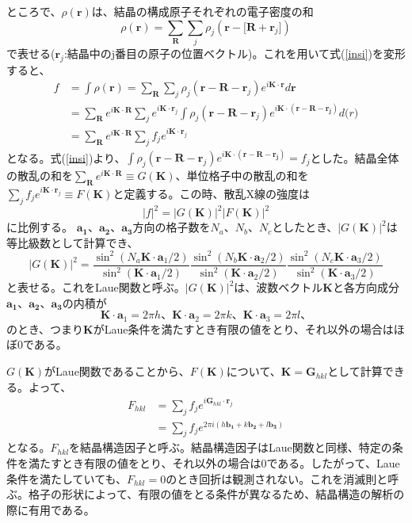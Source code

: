 \documentclass[11pt,a4j,uplatex]{jsarticle}
\begin{document}
\newpage
ところで、$\rho(\bm{r})$は、結晶の構成原子それぞれの電子密度の和
\begin{equation}
 \rho(\bm{r})=\sum_{\bm{R}}\sum_j\rho_j(\bm{r-[R+}\bm{r}_j])
\end{equation}
で表せる($\bm{r}_j$:結晶中のj番目の原子の位置ベクトル)。これを用いて式(\ref{insi})を変形すると、
\begin{equation}
 \begin{split}
  f&=\int\rho(\bm{r})=\sum_{\bm{R}}\sum_j\rho_j(\bm{r-R-}\bm{r}_j)e^{i\bm{K\cdot r}}d\bm{r}\\
  &=\sum_{\bm{R}}e^{i\bm{K\cdot R}}\sum_je^{i\bm{K}\cdot\bm{r}_j}\int\rho_j(\bm{r-R-}\bm{r}_j)e^{i\bm{K\cdot (\bm{r-R-}\bm{r}_j)}}d\bm(r)\\
  &=\sum_{\bm{R}}e^{i\bm{K\cdot R}}\sum_jf_je^{i\bm{K}\cdot\bm{r}_j}
 \end{split}
\end{equation}
となる。式(\ref{insi})より、$\int\rho_j(\bm{r-R-}\bm{r}_j)e^{i\bm{K\cdot (\bm{r-R-}\bm{r}_j)}}=f_j$とした。結晶全体の散乱の和を$\sum_{\bm{R}}e^{i\bm{K\cdot R}}\equiv G(\bm{K})$、単位格子中の散乱の和を$\sum_jf_je^{i\bm{K}\cdot\bm{r}_j}\equiv F(\bm{K})$と定義する。この時、散乱X線の強度は
\begin{equation}
 {|f|}^2={|G\bm{(K)}|^2}{|F\bm{(K)}|^2}
 \label{kyoudo}
\end{equation}に比例する。
$\bm{a_1}、\bm{a_2}、\bm{a_3}$方向の格子数を$N_a、N_b、N_c$としたとき、$|G(\bm{K})|^2$は等比級数として計算でき、
\begin{equation}
 |G(\bm{K})|^2=\frac{\sin^2(N_a\bm{K}\cdot\bm{a}_1/2)}{\sin^2(\bm{K}\cdot\bm{a}_1/2)}\frac{\sin^2(N_b\bm{K}\cdot\bm{a}_2/2)}{\sin^2(\bm{K}\cdot\bm{a}_2/2)}\frac{\sin^2(N_c\bm{K}\cdot\bm{a}_3/2)}{\sin^2(\bm{K}\cdot\bm{a}_3/2)}
\end{equation}
と表せる。これをLaue関数と呼ぶ。$|G(\bm{K})|^2$は、波数ベクトル$\bm{K}$と各方向成分$\bm{a_1}、\bm{a_2}、\bm{a_3}$の内積が
\begin{equation}
 \bm{K}\cdot\bm{a}_1=2\pi h、\bm{K}\cdot\bm{a}_2=2\pi k、\bm{K}\cdot\bm{a}_3=2\pi l、
\end{equation}
のとき、つまり$\bm{K}$がLaue条件を満たすとき有限の値をとり、それ以外の場合はほぼ0である。%

$G(\bm{K})$がLaue関数であることから、$F(\bm{K})$について、$\bm{K}=\bm{G}_{hkl}$として計算できる。よって、
\begin{equation}
 \begin{split}
  F_{hkl}&=\sum_jf_je^{i\bm{G}_{hkl}\cdot\bm{r}_j}\\
  &=\sum_jf_je^{2\pi i(h\bm{b_1}+k\bm{b_2}+l\bm{b_3})}
 \end{split}
\end{equation}
となる。$F_{hkl}$を結晶構造因子と呼ぶ。結晶構造因子はLaue関数と同様、特定の条件を満たすとき有限の値をとり、それ以外の場合は0である。したがって、Laue条件を満たしていても、$F_{hkl}=0$のとき回折は観測されない。これを消滅則と呼ぶ。格子の形状によって、有限の値をとる条件が異なるため、結晶構造の解析の際に有用である。
\end{document}
